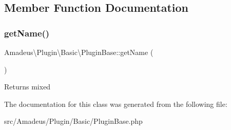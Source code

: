 \subsection{Member Function Documentation}
\mbox{\label{classAmadeus_1_1Plugin_1_1Basic_1_1PluginBase_af35a310762f2f18efc46d06a42adb1cc}} 
\subsubsection{\texorpdfstring{get\+Name()}{getName()}}
{\footnotesize\ttfamily Amadeus\textbackslash{}\+Plugin\textbackslash{}\+Basic\textbackslash{}\+Plugin\+Base\+::get\+Name (\begin{DoxyParamCaption}{ }\end{DoxyParamCaption})\hspace{0.3cm}{\ttfamily [abstract]}}

\begin{DoxyReturn}{Returns}
mixed 
\end{DoxyReturn}


The documentation for this class was generated from the following file\+:\begin{DoxyCompactItemize}
\item 
src/\+Amadeus/\+Plugin/\+Basic/Plugin\+Base.\+php\end{DoxyCompactItemize}
